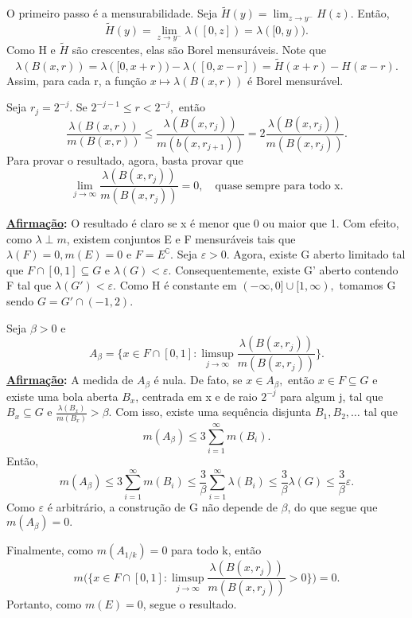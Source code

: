 \documentclass[measure_theory.tex]{subfiles}
\begin{document}
\begin{proof*}
	O primeiro passo é a mensurabilidade. Seja \(\tilde{H}(y) = \lim_{z\to y^{-}}H(z).\) Então,
	\[
		\tilde{H}(y) = \lim_{z\to y^{-}}\lambda ([0, z])=\lambda ([0, y)).
	\]
	Como H e \(\tilde{H}\) são crescentes, elas são Borel mensuráveis. Note que
	\[
		\lambda (B(x, r)) = \lambda ([0, x + r)) - \lambda ([0, x - r]) = \tilde{H}(x+r) - H(x-r).
	\]
	Assim, para cada r, a função \(x\mapsto \lambda (B(x, r))\) é Borel mensurável.

	Seja \(r_{j} = 2^{-j}.\) Se \(2^{-j-1}\leq r < 2^{-j}, \) então
	\[
		\frac{\lambda (B(x, r))}{m(B(x, r))} \leq \frac{\lambda (B(x, r_{j}))}{m(b(x, r_{j+1}))} = 2 \frac{\lambda (B(x, r_{j}))}{m(B(x, r_{j}))}.
	\]
	Para provar o resultado, agora, basta provar que
	\[
		\lim_{j\to \infty}\frac{\lambda (B(x, r_{j}))}{m(B(x, r_{j}))} = 0,\quad \text{quase sempre para todo x.}
	\]

	\textbf{\underline{Afirmação}:} O resultado é claro se x é menor que 0 ou maior que 1.
	Com efeito, como \(\lambda \perp m\), existem conjuntos E e F mensuráveis tais que \(\lambda (F) = 0, m(E) = 0\) e \(F = E ^{\complement}.\) Seja \(\varepsilon > 0\). Agora, existe G aberto limitado tal que \(F\cap [0, 1]\subseteq G\) e \(\lambda (G) < \varepsilon .\)
	Consequentemente, existe G' aberto contendo F tal que \(\lambda (G') < \varepsilon .\) Como H é constante em \((-\infty, 0]\cup [1, \infty),\) tomamos G sendo \(G = G'\cap (-1, 2)\).

	Seja \(\beta  > 0\) e
	\[
		A_{\beta } = \biggl\{x\in F\cap [0, 1]: \limsup_{j\to \infty}\frac{\lambda (B(x, r_{j}))}{m(B(x, r_{j}))}\biggr\}.
	\]
	\textbf{\underline{Afirmação}:} A medida de \(A_{\beta }\) é nula. De fato, se \(x\in A_{\beta },\) então \(x\in F\subseteq G\) e existe uma bola aberta \(B_{x}\), centrada em x e de raio \(2^{-j}\) para algum j, tal que \(B_{x}\subseteq G\) e \(\frac{\lambda (B_x)}{m(B_x)}>\beta .\)
	Com isso, existe uma sequência disjunta \(B_1, B_2, \dotsc \) tal que
	\[
		m(A_{\beta }) \leq 3\sum\limits_{i=1}^{\infty}m(B_{i}).
	\]
	Então,
	\[
		m(A_{\beta }) \leq 3\sum\limits_{i=1}^{\infty}m(B_{i}) \leq \frac{3}{\beta }\sum\limits_{i=1}^{\infty}\lambda (B_{i}) \leq \frac{3}{\beta }\lambda (G) \leq \frac{3}{\beta }\varepsilon .
	\]
	Como \(\varepsilon \) é arbitrário, a construção de G não depende de \(\beta \), do que segue que \(m(A_{\beta }) = 0.\)

	Finalmente, como \(m(A_{1/k}) = 0\) para todo k, então
	\[
		m \biggl(\biggl\{x\in F\cap [0, 1]: \limsup_{j\to \infty}\frac{\lambda (B(x, r_{j}))}{m(B(x, r_{j}))} > 0\biggr\}\biggr) = 0.
	\]
	Portanto, como \(m(E) = 0\), segue o resultado. \qedsymbol
\end{proof*}
\end{document}
